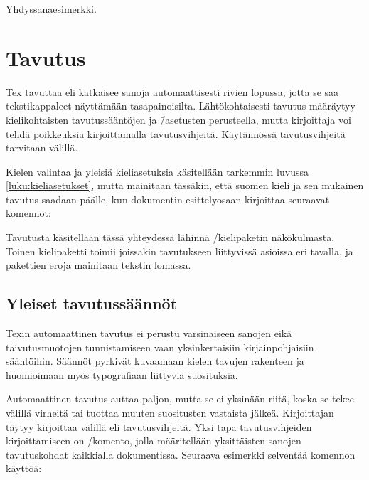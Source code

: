 \begin{tulossis}
  Yhdyssanaesimerkki.
\end{tulossis}

\section{Tavutus}
\label{luku:tavutus}

Tex tavuttaa eli katkaisee sanoja automaattisesti rivien lopussa, jotta
se saa tekstikappaleet näyttämään tasapainoisilta. Lähtökohtaisesti
tavutus määräytyy kielikohtaisten tavutussääntöjen ja \=/asetusten
perusteella, mutta kirjoittaja voi tehdä poikkeuksia kirjoittamalla
tavutusvihjeitä. Käytännössä tavutusvihjeitä tarvitaan välillä.

Kielen valintaa ja yleisiä kieliasetuksia käsitellään tarkemmin luvussa
\ref{luku:kieliasetukset}, mutta mainitaan tässäkin, että suomen kieli
ja sen mukainen tavutus saadaan päälle, kun dokumentin esittelyosaan
kirjoittaa seuraavat komennot:

\begin{koodilohkosis}
  \usepackage{polyglossia}
  \setdefaultlanguage{finnish}
\end{koodilohkosis}

Tavutusta käsitellään tässä yhteydessä lähinnä
\-/kielipaketin näkökulmasta. Toinen kielipaketti
 toimii joissakin tavutukseen liittyvissä asioissa eri
tavalla, ja pakettien eroja mainitaan tekstin lomassa.

\subsection{Yleiset tavutussäännöt}

Texin automaattinen tavutus ei perustu varsinaiseen sanojen eikä
taivutusmuotojen tunnistamiseen vaan yksinkertaisiin kirjainpohjaisiin
sääntöihin. Säännöt pyrkivät kuvaamaan kielen tavujen rakenteen ja
huomioimaan myös typografiaan liittyviä suosituksia.

Automaattinen tavutus auttaa paljon, mutta se ei yksinään riitä, koska
se tekee välillä virheitä tai tuottaa muuten suositusten vastaista
jälkeä. Kirjoittajan täytyy kirjoittaa välillä eli tavutusvihjeitä. Yksi
tapa tavutusvihjeiden kirjoittamiseen on \-/komento, jolla määritellään yksittäisten sanojen
tavutuskohdat kaikkialla dokumentissa. Seuraava esimerkki selventää
komennon käyttöä:

\begin{koodilohkosis}
\end{koodilohkosis}

